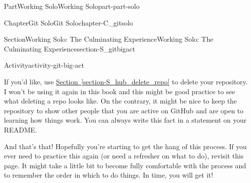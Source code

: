 \documentclass[oneside,10pt,]{book}
\newcommand{\xreffont}{\relax}
\begin{document}
\begin{partptx}{Part}{Working Solo}{}{Working Solo}{}{}{part-part-solo}
\begin{chapterptx}{Chapter}{Git Solo}{}{Git Solo}{}{}{chapter-C_gitsolo}
\begin{sectionptx}{Section}{Working Solo: The Culminating Experience}{}{Working Solo: The Culminating Experience}{}{}{section-S_gitbigact}
\begin{activity}{Activity}{}{activity-git-big-act}
\begin{enumerate}[font=\bfseries,label=(\alph*),ref=\alph*]
\end{enumerate}%
If you'd like, use \hyperref[section-S_hub_delete_repo]{Section~{\xreffont\ref{section-S_hub_delete_repo}}} to delete your repository. I won't be using it again in this book and this might be good practice to see what deleting a repo looks like. On the contrary, it might be nice to keep the repository to show other people that you are active on GitHub and are open to learning how things work. You can always write this fact in a statement on your README.%
\end{activity}%
And that's that! Hopefully you're starting to get the hang of this process. If you ever need to practice this again (or need a refresher on what to do), revisit this page. It might take a little bit to become fully comfortable with the process and to remember the order in which to do things. In time, you will get it!%
\end{sectionptx}
\end{chapterptx}
\end{partptx}
%
%
\typeout{************************************************}
\typeout{************************************************}
%
\end{document}
